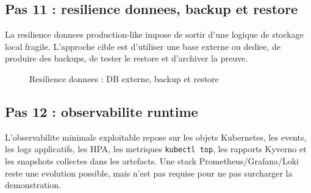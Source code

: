 \subsection{Pas 11 : resilience donnees, backup et restore}

La resilience donnees production-like impose de sortir d'une logique de
stockage local fragile. L'approche cible est d'utiliser une base externe ou
dediee, de produire des backups, de tester le restore et d'archiver la preuve.

\begin{figure}[htbp]
\centering
{}
\caption{Resilience donnees : DB externe, backup et restore}
\label{fig:devsecops-data-resilience}
\end{figure}

\subsection{Pas 12 : observabilite runtime}

L'observabilite minimale exploitable repose sur les objets Kubernetes, les
events, les logs applicatifs, les HPA, les metriques \texttt{kubectl top}, les
rapports Kyverno et les snapshots collectes dans les artefacts. Une stack
Prometheus/Grafana/Loki reste une evolution possible, mais n'est pas requise
pour ne pas surcharger la demonstration.

